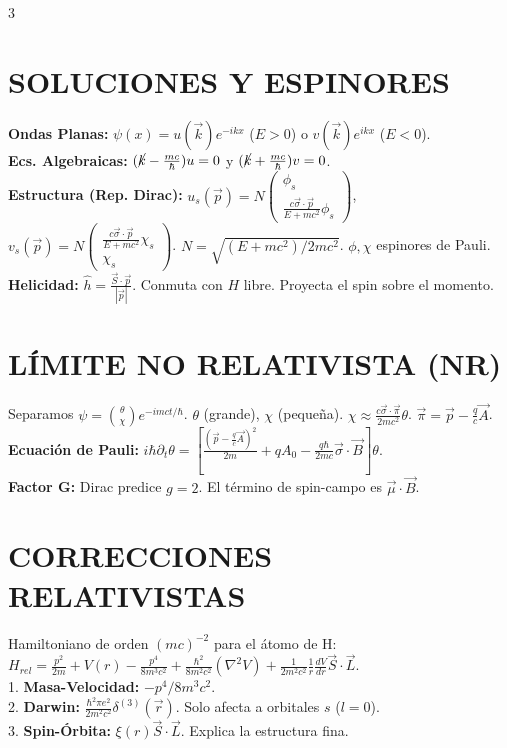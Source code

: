 \documentclass[8pt,a4paper,fleqn]{extarticle} %
\begin{document}
\begin{multicols}{3}
\section{SOLUCIONES Y ESPINORES}
\textbf{Ondas Planas:} $\psi(x) = u(\vec{k})e^{-ikx}$ ($E>0$) o $v(\vec{k})e^{ikx}$ ($E<0$).
\\\textbf{Ecs. Algebraicas:} $(\cancel{k} - \frac{mc}{\hbar})u = 0$ y $(\cancel{k} + \frac{mc}{\hbar})v = 0$.
\\\textbf{Estructura (Rep. Dirac):}
$u_s(\vec{p}) = N \begin{pmatrix} \phi_s \\ \frac{c\vec{\sigma}\cdot\vec{p}}{E+mc^2}\phi_s \end{pmatrix}$, $v_s(\vec{p}) = N \begin{pmatrix} \frac{c\vec{\sigma}\cdot\vec{p}}{E+mc^2}\chi_s \\ \chi_s \end{pmatrix}$.
$N = \sqrt{(E+mc^2)/2mc^2}$. $\phi, \chi$ espinores de Pauli.
\\\textbf{Helicidad:} $\hat{h} = \frac{\vec{S}\cdot\vec{p}}{|\vec{p}|}$. Conmuta con $H$ libre. Proyecta el spin sobre el momento.

\section{LÍMITE NO RELATIVISTA (NR)}
Separamos $\psi = \binom{\theta}{\chi} e^{-imct/\hbar}$. $\theta$ (grande), $\chi$ (pequeña).
$\chi \approx \frac{c\vec{\sigma}\cdot\vec{\pi}}{2mc^2} \theta$. $\vec{\pi} = \vec{p} - \frac{q}{c}\vec{A}$.
\textbf{Ecuación de Pauli:}
$i\hbar \partial_t \theta = \left[ \frac{(\vec{p} - \frac{q}{c}\vec{A})^2}{2m} + qA_0 - \frac{q\hbar}{2mc}\vec{\sigma}\cdot\vec{B} \right] \theta$.
\\\textbf{Factor G:} Dirac predice $g=2$. El término de spin-campo es $\vec{\mu}\cdot\vec{B}$.

\section{CORRECCIONES RELATIVISTAS}
Hamiltoniano de orden $(mc)^{-2}$ para el átomo de H:
$H_{rel} = \frac{p^2}{2m} + V(r) - \frac{p^4}{8m^3c^2} + \frac{\hbar^2}{8m^2c^2}(\nabla^2 V) + \frac{1}{2m^2c^2}\frac{1}{r}\frac{dV}{dr} \vec{S}\cdot\vec{L}$.
\\1. \textbf{Masa-Velocidad:} $-p^4/8m^3c^2$.
\\2. \textbf{Darwin:} $\frac{\hbar^2 \pi e^2}{2m^2c^2} \delta^{(3)}(\vec{r})$. Solo afecta a orbitales $s$ ($l=0$).
\\3. \textbf{Spin-Órbita:} $\xi(r) \vec{S}\cdot\vec{L}$. Explica la estructura fina.


\end{multicols}
\end{document}
